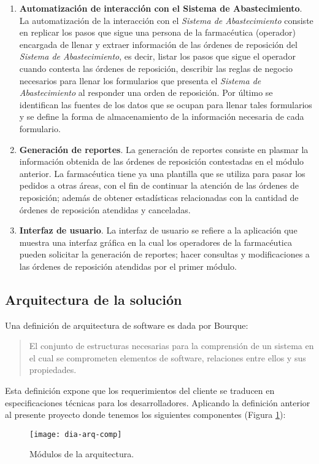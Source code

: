 \begin{enumerate}
\item \textbf{Automatización de interacción con el Sistema de Abastecimiento}. La automatización de la interacción con el \textit{Sistema de Abastecimiento} consiste en replicar los pasos que sigue una persona de la farmacéutica (operador) encargada de llenar y extraer información de las órdenes de reposición del \textit{Sistema de Abastecimiento}, es decir, listar los pasos que sigue el operador cuando contesta las órdenes de reposición, describir las reglas de negocio necesarios para llenar los formularios que presenta el \textit{Sistema de Abastecimiento} al responder una orden de reposición. Por último se identifican las fuentes de los datos que se ocupan para llenar tales formularios y se define la forma de almacenamiento de la información necesaria de cada formulario.
\item \textbf{Generación de reportes}. La generación de reportes consiste en plasmar la información obtenida de las órdenes de reposición contestadas en el módulo anterior. La farmacéutica tiene ya una plantilla que se utiliza para pasar los pedidos a otras áreas, con el fin de continuar la atención de las órdenes de reposición; además de obtener estadísticas relacionadas con la cantidad de órdenes de reposición atendidas y canceladas.
\item \textbf{Interfaz de usuario}. La interfaz de usuario se refiere a la aplicación que muestra una interfaz gráfica en la cual los operadores de la farmacéutica pueden solicitar la generación de reportes; hacer consultas y modificaciones a las órdenes de reposición atendidas por el primer módulo.
\end{enumerate}

\subsection{Arquitectura de la solución}
Una definición de arquitectura de software es dada por Bourque\cite{SWEBOOK}:
\begin{quote}
El conjunto de estructuras necesarias para la comprensión de un sistema en el cual se comprometen elementos de software, relaciones entre ellos y sus propiedades.
\end{quote}
Esta definición expone que los requerimientos del cliente se traducen en especificaciones técnicas para los desarrolladores. Aplicando la definición anterior al presente proyecto donde tenemos los siguientes componentes (Figura \ref{fig:dia-arq-comp}):
\begin{figure}[h]
\centering
\texttt{[image: dia-arq-comp]} 
\caption{Módulos de la arquitectura.}
\label{fig:dia-arq-comp}
\end{figure}

